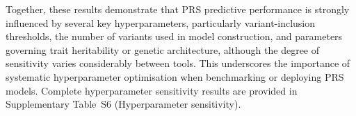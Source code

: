 \documentclass[pdflatex,sn-basic]{sn-jnl}
\begin{document}
Together, these results demonstrate that PRS predictive performance is strongly influenced by several key hyperparameters, particularly variant-inclusion thresholds, the number of variants used in model construction, and parameters governing trait heritability or genetic architecture, although the degree of sensitivity varies considerably between tools. This underscores the importance of systematic hyperparameter optimisation when benchmarking or deploying PRS models. Complete hyperparameter sensitivity results are provided in Supplementary Table~S6 (Hyperparameter sensitivity).





\end{document}
